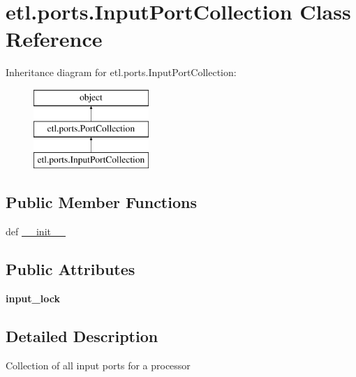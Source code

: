 \hypertarget{classetl_1_1ports_1_1InputPortCollection}{\section{etl.\-ports.\-Input\-Port\-Collection Class Reference}
\label{classetl_1_1ports_1_1InputPortCollection}
}
Inheritance diagram for etl.\-ports.\-Input\-Port\-Collection\-:\begin{figure}[H]
\begin{center}
\leavevmode
\includegraphics[height=3.000000cm]{classetl_1_1ports_1_1InputPortCollection}
\end{center}
\end{figure}
\subsection*{Public Member Functions}
\begin{DoxyCompactItemize}
\item 
def \hyperlink{classetl_1_1ports_1_1InputPortCollection_ac3683354a87d42cecf4201c842d5d00c}{\-\_\-\-\_\-init\-\_\-\-\_\-}
\end{DoxyCompactItemize}
\subsection*{Public Attributes}
\begin{DoxyCompactItemize}
\item 
\hypertarget{classetl_1_1ports_1_1InputPortCollection_af12748c8e1c9507ab18a52bd46bb8a31}{{\bfseries input\-\_\-lock}}\label{classetl_1_1ports_1_1InputPortCollection_af12748c8e1c9507ab18a52bd46bb8a31}

\end{DoxyCompactItemize}


\subsection{Detailed Description}
\begin{DoxyVerb}Collection of all input ports for a processor\end{DoxyVerb}
 

